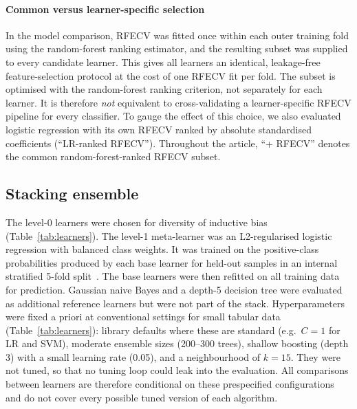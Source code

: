 \documentclass[preprint,12pt,authoryear=false]{elsarticle}
\begin{document}
\paragraph{Common versus learner-specific selection}
In the model comparison, RFECV was fitted once within each outer training fold using the random-forest ranking estimator, and the resulting subset was supplied to every candidate learner. This gives all learners an identical, leakage-free feature-selection protocol at the cost of one RFECV fit per fold. The subset is optimised with the random-forest ranking criterion, not separately for each learner. It is therefore \emph{not} equivalent to cross-validating a learner-specific RFECV pipeline for every classifier. To gauge the effect of this choice, we also evaluated logistic regression with its own RFECV ranked by absolute standardised coefficients (``LR-ranked RFECV''). Throughout the article, ``+ RFECV'' denotes the common random-forest-ranked RFECV subset.

\subsection{Stacking ensemble}
The level-0 learners were chosen for diversity of inductive bias (Table~\ref{tab:learners}). The level-1 meta-learner was an L2-regularised logistic regression with balanced class weights. It was trained on the positive-class probabilities produced by each base learner for held-out samples in an internal stratified 5-fold split~\cite{wolpert1992stacked,ting1999issues}. The base learners were then refitted on all training data for prediction. Gaussian naive Bayes and a depth-5 decision tree were evaluated as additional reference learners but were not part of the stack. Hyperparameters were fixed a priori at conventional settings for small tabular data (Table~\ref{tab:learners}): library defaults where these are standard (e.g.\ $C=1$ for LR and SVM), moderate ensemble sizes (200--300 trees), shallow boosting (depth 3) with a small learning rate (0.05), and a neighbourhood of $k=15$. They were not tuned, so that no tuning loop could leak into the evaluation. All comparisons between learners are therefore conditional on these prespecified configurations and do not cover every possible tuned version of each algorithm.
\end{document}
